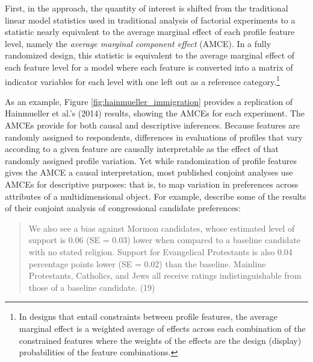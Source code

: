 \documentclass[a4paper,12pt]{article}\usepackage[]{graphicx}\usepackage[]{color}
\begin{document}
First, in the \citet{HainmuellerHopkinsYamamoto2014} approach, the quantity of interest is shifted from the traditional linear model statistics used in traditional analysis of factorial experiments to a statistic nearly equivalent to the average marginal effect of each profile feature level, namely the \textit{average marginal component effect} (AMCE). In a fully randomized design, this statistic is equivalent to the average marginal effect of each feature level for a model where each feature is converted into a matrix of indicator variables for each level with one left out as a reference category.\footnote{In designs that entail constraints between profile features, the average marginal effect is a weighted average of effects across each combination of the constrained features where the weights of the effects are the design (display) probabilities of the feature combinations.}

As an example, Figure \ref{fig:hainmueller_immigration} provides a replication of Hainmueller et al.'s (2014) results, showing the AMCEs for each experiment. The AMCEs provide for both causal and descriptive inferences. Because features are randomly assigned to respondents, differences in evaluations of profiles that vary according to a given feature are causally interpretable as the effect of that randomly assigned profile variation. Yet while randomization of profile features gives the AMCE a causal interpretation, most published conjoint analyses use AMCEs for descriptive purposes: that is, to map variation in preferences across attributes of a multidimensional object. For example, \citet{HainmuellerHopkinsYamamoto2014} describe some of the results of their conjoint analysis of congressional candidate preferences:

\begin{quote}
We also see a bias against Mormon candidates, whose estimated level of support is 0.06 (SE = 0.03) lower when compared to a baseline candidate with no stated religion. Support for Evangelical Protestants is also 0.04 percentage points lower (SE = 0.02) than the baseline. Mainline Protestants, Catholics, and Jews all receive ratings indistinguishable from those of a baseline candidate. (19)
\end{quote}
\end{document}
